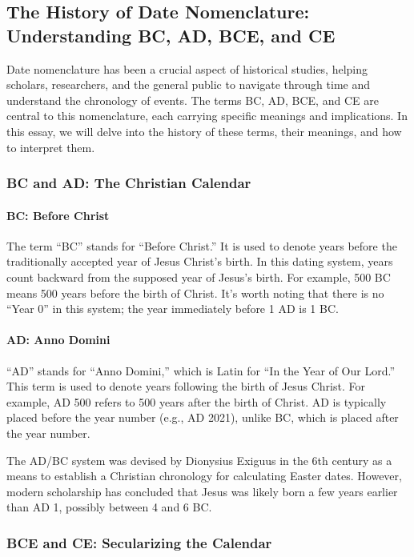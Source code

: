 \documentclass[a4paper,12pt]{book}
\begin{document}
\subsection*{The History of Date Nomenclature: Understanding BC, AD, BCE, and CE}
Date nomenclature has been a crucial aspect of historical studies, helping scholars, researchers, and the general public to navigate through time and understand the chronology of events. The terms BC, AD, BCE, and CE are central to this nomenclature, each carrying specific meanings and implications. In this essay, we will delve into the history of these terms, their meanings, and how to interpret them.

\subsubsection*{BC and AD: The Christian Calendar}
\paragraph{BC: Before Christ}
The term ``BC'' stands for ``Before Christ.'' It is used to denote years before the traditionally accepted year of Jesus Christ’s birth. In this dating system, years count backward from the supposed year of Jesus’s birth. For example, 500 BC means 500 years before the birth of Christ. It’s worth noting that there is no ``Year 0'' in this system; the year immediately before 1 AD is 1 BC.

\paragraph{AD: Anno Domini}
``AD'' stands for ``Anno Domini,'' which is Latin for ``In the Year of Our Lord.'' This term is used to denote years following the birth of Jesus Christ. For example, AD 500 refers to 500 years after the birth of Christ. AD is typically placed before the year number (e.g., AD 2021), unlike BC, which is placed after the year number.

The AD/BC system was devised by Dionysius Exiguus in the 6th century as a means to establish a Christian chronology for calculating Easter dates. However, modern scholarship has concluded that Jesus was likely born a few years earlier than AD 1, possibly between 4 and 6 BC.

\subsubsection*{BCE and CE: Secularizing the Calendar}
\end{document}
